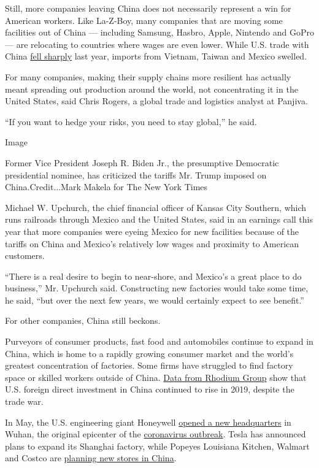 Still, more companies leaving China does not necessarily represent a win
for American workers. Like La-Z-Boy, many companies that are moving some
facilities out of China --- including Samsung, Hasbro, Apple, Nintendo
and GoPro --- are relocating to countries where wages are even lower.
While U.S. trade with China
\href{https://www.nytimes.com/2020/02/05/business/economy/trump-trade.html}{fell
sharply} last year, imports from Vietnam, Taiwan and Mexico swelled.

For many companies, making their supply chains more resilient has
actually meant spreading out production around the world, not
concentrating it in the United States, said Chris Rogers, a global trade
and logistics analyst at Panjiva.

``If you want to hedge your risks, you need to stay global,'' he said.

Image

Former Vice President Joseph R. Biden Jr., the presumptive Democratic
presidential nominee, has criticized the tariffs Mr. Trump imposed on
China.Credit...Mark Makela for The New York Times

Michael W. Upchurch, the chief financial officer of Kansas City
Southern, which runs railroads through Mexico and the United States,
said in an earnings call this year that more companies were eyeing
Mexico for new facilities because of the tariffs on China and Mexico's
relatively low wages and proximity to American customers.

``There is a real desire to begin to near-shore, and Mexico's a great
place to do business,'' Mr. Upchurch said. Constructing new factories
would take some time, he said, ``but over the next few years, we would
certainly expect to see benefit.''

For other companies, China still beckons.

Purveyors of consumer products, fast food and automobiles continue to
expand in China, which is home to a rapidly growing consumer market and
the world's greatest concentration of factories. Some firms have
struggled to find factory space or skilled workers outside of China.
\href{https://rhg.com/research/two-way-street-us-china-investment-trends-2020-update/}{Data
from Rhodium Group} show that U.S. foreign direct investment in China
continued to rise in 2019, despite the trade war.

In May, the U.S. engineering giant Honeywell
\href{http://www.xinhuanet.com/english/2020-05/19/c_139070358.htm}{opened
a new headquarters} in Wuhan, the original epicenter of the
\href{https://www.nytimes.com/news-event/coronavirus}{coronavirus
outbreak}. Tesla has announced plans to expand its Shanghai factory,
while Popeyes Louisiana Kitchen, Walmart and Costco are
\href{https://www.wsj.com/articles/neither-coronavirus-nor-trade-tensions-can-stop-u-s-companies-push-into-china-11589880603}{planning
new stores in China}.

